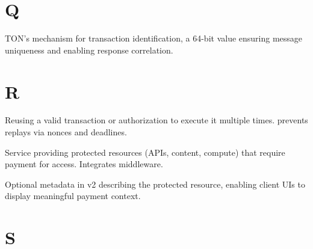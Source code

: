 \section*{Q}

\begin{description}[style=nextline]

\item[query\_id]
TON's mechanism for transaction identification, a 64-bit value ensuring message uniqueness and enabling response correlation.

\end{description}

\section*{R}

\begin{description}[style=nextline]

\item[Replay Attack]
Reusing a valid transaction or authorization to execute it multiple times. \tprotocol{} prevents replays via nonces and deadlines.

\item[Resource Server]
Service providing protected resources (APIs, content, compute) that require payment for access. Integrates \tprotocol{} middleware.

\item[ResourceInfo]
Optional metadata in \tprotocol{} v2 describing the protected resource, enabling client UIs to display meaningful payment context.

\end{description}

\section*{S}

